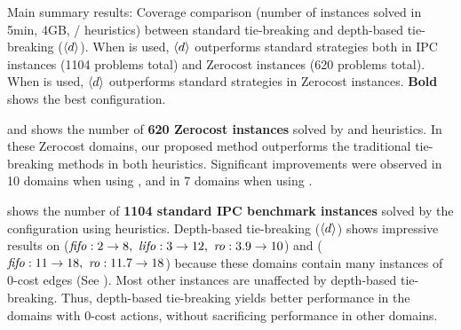 \begin{table}[htb]
 {
 \centering
 \setlength{\tabcolsep}{3pt}
 
 \caption{
 Main summary results: Coverage comparison (number of instances solved in 5min, 4GB, \lmcut/\mands
 heuristics) between standard tie-breaking and depth-based tie-breaking
 (${\left<d\right>}$). When \lmcut is used, ${\left<d\right>}$ outperforms standard strategies both in IPC
 instances (1104 problems total) and Zerocost instances (620 problems
 total). When \mands is used, ${\left<d\right>}$ outperforms standard strategies
 in Zerocost instances. \textbf{Bold} shows the best configuration.}
 \label{tbl:depth-summary}
 }
\end{table}

 and  shows the number of \textbf{620 Zerocost
instances} solved by \lmcut and \mands heuristics. In these
Zerocost domains, our proposed method outperforms the traditional tie-breaking methods in both heuristics.
Significant improvements were observed in 10 domains when using \lmcut, and in 7 domains when using \mands.


 shows the number of \textbf{1104 standard IPC benchmark instances} solved by the configuration using \lmcut
heuristics. Depth-based tie-breaking (${\left<d\right>}$) shows impressive results on  ($\fifo:2\to 8,\ \lifo:3\to 12,\  \ro:3.9\to 10$) and  (${\text{\textit{fifo}}}: 11\to 18,\ {\text{\textit{ro}}}: 11.7\to 18$) because these
domains contain many instances of 0-cost edges (See
).  Most other instances are unaffected by depth-based tie-breaking.  Thus, depth-based
tie-breaking yields better performance in the domains with 0-cost actions, without sacrificing performance in
other domains.

